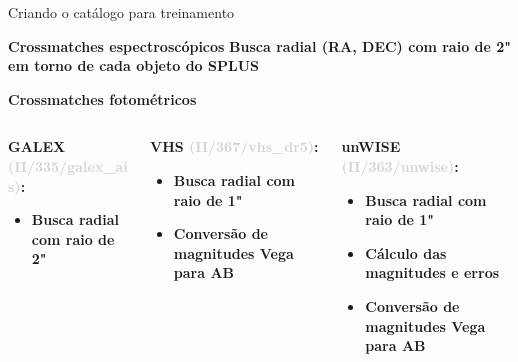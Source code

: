 \begin{frame}[c]{Criando o catálogo para treinamento}
    \begin{splusbox}{\textbf{Crossmatches espectroscópicos}}
        \small
        \textbf{Busca radial (RA, DEC) com raio de 2" em torno de cada objeto do SPLUS}
    \end{splusbox}
    \begin{splusbox}{\textbf{Crossmatches fotométricos}}
        \small
        \begin{columns}[t]
            \begin{column}{0.29\textwidth}
               \textbf{GALEX \textcolor{LightGray}{(II/335/galex\_ais)}:}
               \begin{itemize}
                    \item \textbf{Busca radial com raio de 2"}
                \end{itemize}
            \end{column}
            \begin{column}{0.29\textwidth}
                \textbf{VHS \textcolor{LightGray}{(II/367/vhs\_dr5)}:}
                \begin{itemize}
                    \justifying
                    \item \textbf{Busca radial com raio de 1"}
                    \item \textbf{Conversão de magnitudes Vega para AB}
                \end{itemize}
            \end{column}
            \begin{column}{0.29\textwidth}
                \textbf{unWISE \textcolor{LightGray}{(II/363/unwise)}:}
                \begin{itemize}
                    \justifying
                    \item \textbf{Busca radial com raio de 1"}
                    \item \textbf{Cálculo das magnitudes e erros}
                    \item \textbf{Conversão de magnitudes Vega para AB}
                \end{itemize}
            \end{column}
        \end{columns}
    \end{splusbox}
\end{frame}

